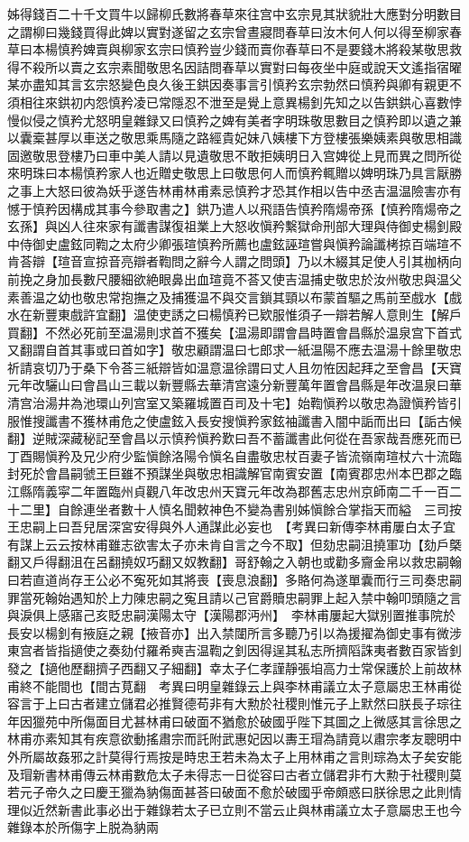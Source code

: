 姊得錢百二十千文買牛以歸柳氏數將春草來往宫中玄宗見其狀貌壯大應對分明數目之謂柳曰幾錢買得此婢以實對遂留之玄宗曾晝寢問春草曰汝木何人何以得至柳家春草曰本楊慎矜婢賣與柳家玄宗曰慎矜豈少錢而賣你春草曰不是要錢木將殺某敬思救得不殺所以賣之玄宗素聞敬思名因詰問春草以實對曰每夜坐中庭或說天文遙指宿曜某亦盡知其言玄宗怒變色良久後王鉷因奏事言引慎矜玄宗勃然曰慎矜與卿有親更不須相往來鉷初内怨慎矜凌已常隱忍不泄至是覺上意異楊釗先知之以告鉷鉷心喜數悖慢似侵之慎矜尤怒明皇雜録又曰慎矜之婢有美者字明珠敬思數目之慎矜即以遺之兼以囊槖甚厚以車送之敬思乘馬隨之路經貴妃妹八姨樓下方登樓張樂姨素與敬思相識固邀敬思登樓乃曰車中美人請以見遺敬思不敢拒姨明日入宫婢從上見而異之問所從來明珠曰本楊慎矜家人也近贈史敬思上曰敬思何人而慎矜輒贈以婢明珠乃具言厭勝之事上大怒曰彼為妖乎遂告林甫林甫素忌慎矜才恐其作相以告中丞吉温温險害亦有憾于慎矜因構成其事今參取書之】鉷乃遣人以飛語告慎矜隋煬帝孫【慎矜隋煬帝之玄孫】與凶人往來家有讖書謀復祖業上大怒收愼矜繫獄命刑部大理與侍御史楊釗殿中侍御史盧鉉同鞫之太府少卿張瑄慎矜所薦也盧鉉誣瑄嘗與愼矜論讖栲掠百端瑄不肯荅辯【瑄音宣掠音亮辯者鞫問之辭今人謂之問頭】乃以木綴其足使人引其枷柄向前挽之身加長數尺腰細欲絶眼鼻出血瑄竟不荅又使吉温捕史敬忠於汝州敬忠與温父素善温之幼也敬忠常抱撫之及捕獲温不與交言鎖其頸以布蒙首驅之馬前至戲水【戲水在新豐東戲許宜翻】温使吏誘之曰楊慎矜已欵服惟須子一辯若解人意則生【解戶買翻】不然必死前至温湯則求首不獲矣【温湯即謂會昌時置會昌縣於温泉宫下首式又翻謂自首其事或曰首如字】敬忠顧謂温曰七郎求一紙温陽不應去温湯十餘里敬忠祈請哀切乃于桑下令荅三紙辯皆如温意温徐謂曰丈人且勿恠因起拜之至會昌【天寶元年改驪山曰會昌山三載以新豐縣去華清宫遠分新豐萬年置會昌縣是年改温泉曰華清宫治湯井為池環山列宫室又築羅城置百司及十宅】始鞫愼矜以敬忠為證愼矜皆引服惟搜讖書不獲林甫危之使盧鉉入長安搜愼矜家鉉袖讖書入闇中詬而出曰【詬古候翻】逆賊深藏秘記至會昌以示慎矜愼矜歎曰吾不蓄讖書此何從在吾家哉吾應死而已丁酉賜愼矜及兄少府少監愼餘洛陽令愼名自盡敬忠杖百妻子皆流嶺南瑄杖六十流臨封死於會昌嗣虢王巨雖不預謀坐與敬忠相識解官南賓安置【南賓郡忠州本巴郡之臨江縣隋義寜二年置臨州貞觀八年改忠州天寶元年改為郡舊志忠州京師南二千一百二十二里】自餘連坐者數十人慎名聞敕神色不變為書别姊愼餘合掌指天而縊　三司按王忠嗣上曰吾兒居深宮安得與外人通謀此必妄也　【考異曰新傳李林甫屢白太子宜有謀上云云按林甫雖志欲害太子亦未肯自言之今不取】但劾忠嗣沮撓軍功【劾戶槩翻又戶得翻沮在呂翻撓奴巧翻又奴教翻】哥舒翰之入朝也或勸多齎金帛以救忠嗣翰曰若直道尚存王公必不寃死如其將喪【喪息浪翻】多賂何為遂單囊而行三司奏忠嗣罪當死翰始遇知於上力陳忠嗣之寃且請以己官爵贖忠嗣罪上起入禁中翰叩頭隨之言與淚俱上感寤己亥貶忠嗣漢陽太守【漢陽郡沔州】　李林甫屢起大獄别置推事院於長安以楊釗有掖庭之親【掖音亦】出入禁闥所言多聽乃引以為援擢為御史事有微涉東宫者皆指擿使之奏劾付羅希奭吉温鞫之釗因得逞其私志所擠䧟誅夷者數百家皆釗發之【擿他歷翻擠子西翻又子細翻】幸太子仁孝謹靜張垍高力士常保護於上前故林甫終不能間也【間古莧翻　考異曰明皇雜錄云上與李林甫議立太子意屬忠王林甫從容言于上曰古者建立儲君必推賢德苟非有大勲於社稷則惟元子上默然曰朕長子琮往年因獵苑中所傷面目尤甚林甫曰破面不猶愈於破國乎陛下其圖之上微感其言徐思之林甫亦素知其有疾意欲動搖肅宗而託附武惠妃因以夀王瑁為請竟以肅宗孝友聰明中外所屬故姦邪之計莫得行焉按是時忠王若未為太子上用林甫之言則琮為太子矣安能及瑁新書林甫傳云林甫數危太子未得志一日從容曰古者立儲君非冇大勲于社稷則莫若元子帝久之曰慶王獵為豽傷面甚荅曰破面不愈於破國乎帝頗惑曰朕徐思之此則情理似近然新書此事必出于雜錄若太子已立則不當云止與林甫議立太子意屬忠王也今雜錄本於所傷字上脱為豽兩